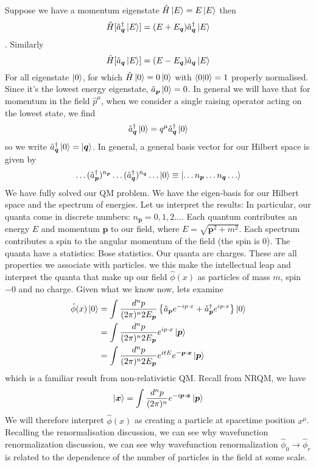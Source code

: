 Suppose we have a momentum eigenstate $\hat{H}\ket{E} = E\ket{E}$ then $$\hat{H} [\hat{a}_{\bm{q}}^{\dagger} \ket{E}] = (E + E_{\bm{q}}) \hat{a}_{\bm{q}}^{\dagger} \ket{E}$$. Similarly 
$$\hat{H} [\hat{a}_{\bm{q}} \ket{E}] = (E - E_{\bm{q}}) \hat{a}_{\bm{q}} \ket{E}$$For all eigenstate $\ket{0}$, for which $\hat{H}\ket{0} = 0\ket{0}$ with $\expval{0|0} = 1$ properly normalised. Since it's the lowest energy eigenstate, $\hat{a}_{\bm{p}} \ket{0}  =0$. In general we will have that for momentum in the field $\hat{p}^\mu$, when we consider a single raising operator acting on the lowest state, we find
\begin{equation}
     \hat{a}_{\bm{q}}^{\dagger} \ket{0} = q^\mu \hat{a}_{\bm{q}}^{\dagger} \ket{0}
\end{equation}
so we write $\hat{a}_{\bm{q}}^{\dagger} \ket{0} = \ket{\bm{q}}$. In general, a general basis vector for our Hilbert space is given by $$\dots (\hat{a}_{\bm{p}}^{\dagger})^{n_{\bm{p}}} \dots(\hat{a}_{\bm{q}}^{\dagger})^{n_{\bm{q}}} \dots \ket{0}  \equiv \ket{\dots n_{\bm{p}} \dots n_{\bm{q}} \dots }$$
We have fully solved our QM problem. We have the eigen-basis for our Hilbert space and the spectrum of energies. Let us interpret the results: In particular, our quanta come in discrete numbers: $n_{\bm{p}}= 0, 1, 2. \dots$ Each quantum contributes an energy $E$ and momentum $\bm{p}$ to our field, where $E = \sqrt{\bm{p}^2 +m^2}$. Each spectrum contributes a spin to the angular momentum of the field (the spin is $0$). The quanta have a statistics: Bose statistics. Our quanta are charges. These are all properties we associate with particles. we this make the intellectual leap and interpret the quanta that make up our field $\hat{\phi}(x)$ as particles of mass $m$, spin$-0$ and no charge. Given what we know now, lets examine 
\begin{align}
    \hat{\phi}(x)\ket{0} & = \int \frac{d^n p}{(2\pi)^n 2E_{\bm{p}}} \left\{ \hat{a}_{\bm{p}} e^{-ip\cdot x} + \hat{a}_{\bm{p}}^{\dagger} e^{ip\cdot x} \right\}\ket{0} \nonumber\\
    & = \int \frac{d^n p}{(2\pi)^n 2E_{\bm{p}}} e^{ip\cdot x} \ket{\bm{p}} \nonumber\\
    & = \int \frac{d^n p}{(2\pi)^n 2E_{\bm{p}}} e^{itE} e^{-\bm{p}\cdot \bm{x}} \ket{\bm{p}}
\end{align}
which is a familiar result from non-relativistic QM. Recall from NRQM, we have 
\begin{equation}
    \ket{\bm{x}} = \int \frac{d^n p}{(2\pi)^n} e^{-i\bm{p}\cdot \bm{x}} \ket{\bm{p}}
\end{equation}
We will therefore interpret $\hat{\phi}(x)$ as creating a particle at spacetime position $x^\mu$. Recalling the renormalisation discussion, we can see why wavefunction renormalization discussion, we can see why wavefunction renormalization $\hat{\phi}_0 \to \hat{\phi}_r$ is related to the dependence of the number of particles in the field at some scale.

